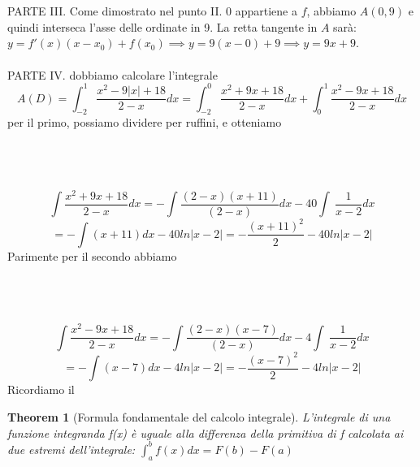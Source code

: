 \documentclass{article}
\newtheorem{theorem}{Theorem}
\begin{document}
\\\\
PARTE III.
Come dimostrato nel punto II. 0 appartiene a $f$, abbiamo $A(0,9)$ e quindi interseca l'asse delle ordinate in 9. La retta tangente in $A$ sarà: $y = f'(x)(x-x_0) +f(x_0) \implies y = 9(x-0) + 9 \implies y = 9x+ 9$.
\\\\PARTE IV. dobbiamo calcolare l'integrale 
\[
A(D) = \int_{-2}^1 \frac{x^2 - 9|x| + 18}{2-x}dx =  \int_{-2}^0\frac{x^2 + 9x + 18}{2-x}dx + 
 \int_{0}^1\frac{x^2 - 9x + 18}{2-x}dx
\]
per il primo, possiamo dividere per ruffini, e otteniamo
\\\\
\\\\
\[
\int \frac{x^2 + 9x + 18}{2-x}dx = -\int \frac{(2-x)(x+11)}{(2-x)}dx  -40\int\ \frac{1}{x-2}dx
\]
\[
= -\int (x+11) dx - 40ln|x-2| = -\frac{(x+11)^2}{2} - 40ln|x-2|
\]
Parimente per il secondo abbiamo
\\\\
\\\\
\[
\int \frac{x^2 - 9x + 18}{2-x}dx = -\int \frac{(2-x)(x-7)}{(2-x)}dx  -4\int\ \frac{1}{x-2}dx
\]
\[
= -\int (x-7) dx - 4ln|x-2| = -\frac{(x-7)^2}{2} - 4ln|x-2|
\]
Ricordiamo il
\begin{theorem}[Formula fondamentale del calcolo integrale]
L'integrale di una funzione integranda f(x) è uguale alla differenza della primitiva di f calcolata ai due estremi dell'integrale:
$\int_a^b f(x)dx = F(b) - F(a)$
\end{theorem}
\end{document}
